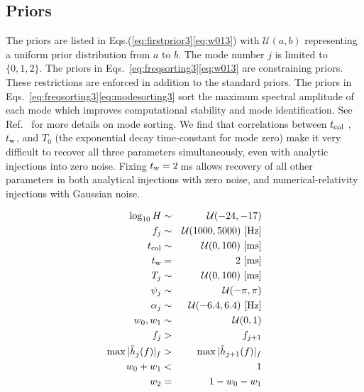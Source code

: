 \documentclass[../Thesis.tex]{subfiles}
\begin{document}
\begin{subappendices}


\renewcommand\thefigure{\thesection.\arabic{figure}} 
\renewcommand\thetable{\thesection.\arabic{table}} 
\setcounter{figure}{0} 
\setcounter{table}{0} 


\section{Priors}
\label{appendix:a3}
    The priors are listed in Eqs.(\ref{eq:firstprior3}\Hyphdash*\ref{eq:w013}) with $\mathcal{U}(a,b)$ representing a uniform prior distribution from $a$ to $b$. 
    The mode number $j$ is limited to $\lbrace 0,1,2 \rbrace$. 
    The priors in Eqs.~\ref{eq:freqsorting3}\Hyphdash*\ref{eq:w013} are constraining priors. 
    These restrictions are enforced in addition to the standard priors. 
    The priors in Eqs.~\ref{eq:freqsorting3}\Hyphdash*\ref{eq:modesorting3} sort the maximum spectral amplitude of each mode which improves computational stability and mode identification.
    See Ref.~\cite{Easter2020} for more details on mode sorting.
    We find that correlations between $t_{\mathrm{col}}$ , $t_{\mathrm{w}}$, and $T_0$ (the exponential decay time-constant for mode zero) make it very difficult to recover all three parameters simultaneously, even with analytic injections into zero noise.
    Fixing $t_{\mathrm{w}}=2$\,ms allows recovery of all other parameters in both analytical injections with zero noise, and numerical-relativity injections with Gaussian noise.
    
    
    \begin{eqnarray}
        \log_{10}{H} & \sim & \mathcal{U}(-24, -17)\label{eq:firstprior3}  \\
        f_j & \sim & \mathcal{U}(1000,5000)\  [\mathrm{Hz}]\\
        t_{\mathrm{col}} & \sim & \mathcal{U}(0,100)\  [\mathrm{ms}]\\
        t_{\mathrm{w}} & = & 2\  [\mathrm{ms}]\\
        T_j & \sim & \mathcal{U}(0,100)\ [\mathrm{ms}]\\
        \psi_j & \sim & \mathcal{U}(-\pi,\pi) \\
        \alpha_j & \sim & \mathcal{U}(-6.4,6.4)\   [\mathrm{Hz}] \\
        w_0, w_1 & \sim & \mathcal{U}(0,1)\label{eq:lastprior3}\\
        f_{j}  & > & f_{j+1}\label{eq:freqsorting3}\\
        \max|\tilde{h}_{j}(f)|_f & > & \max|\tilde{h}_{j+1}(f)|_f \label{eq:modesorting3}\\
        w_0+w_1 & < & 1  \label{eq:w013}\\
        w_2 & = & 1 - w_0 - w_1 \label{eq:w23}
    \end{eqnarray}
    \pagebreak
    

\end{subappendices}
\end{document}
